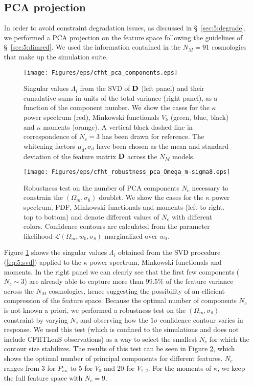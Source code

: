\subsection{PCA projection}
In order to avoid constraint degradation issues, as discussed in \S~\ref{sec:5:degrade}, we performed a PCA projection on the feature space following the guidelines of \S~\ref{sec:5:dimred}. We used the information contained in the $N_M=91$ cosmologies that make up the  simulation suite. 
%
\begin{figure}
\begin{center}
\texttt{[image: Figures/eps/cfht\_pca\_components.eps]}
\end{center}
\caption{Singular values $\Lambda_i$ from the SVD of $\mathbf{D}$ (left panel) and their cumulative sums in units of the total variance (right panel), as a function of the component number. We show the cases for the $\kappa$ power spectrum (red), Minkowski functionals $V_k$ (green, blue, black) and $\kappa$ moments (orange). A vertical black dashed line in correspondence of $N_c=3$ has been drawn for reference. The whitening factors $\mu_d,\sigma_d$ have been chosen as the mean and standard deviation of the feature matrix $\mathbf{D}$ across the $N_M$ models.}
\label{fig:6:pcacomp}
\end{figure} 
%
\begin{figure}
\begin{center}
\texttt{[image: Figures/eps/cfht\_robustness\_pca\_Omega\_m-sigma8.eps]}
\end{center}
\caption{Robustness test on the number of PCA components $N_c$ necessary to constrain the $(\Omega_m,\sigma_8)$ doublet. We show the cases for the $\kappa$ power spectrum, PDF, Minkowski functionals and moments (left to right, top to bottom) and denote different values of $N_c$ with different colors. Confidence contours are calculated from the parameter likelihood $\mathcal{L}(\Omega_m,w_0,\sigma_8)$ marginalized over $w_0$.}
\label{fig:6:robustness}
\end{figure}
%
Figure \ref{fig:6:pcacomp} shows the singular values $\Lambda_i$ obtained from the SVD procedure (\ref{eq:5:svd}) applied to the $\kappa$ power spectrum, Minkowski functionals and moments. In the right panel we can clearly see that the first few components ($N_c\sim 3$) are already able to capture more than 99.5\% of the feature variance across the $N_M$ cosmologies, hence suggesting the possibility of an efficient compression of the feature space. Because the optimal number of components $N_c$ is not known a priori, we performed a robustness test on the $(\Omega_m,\sigma_8)$ constraint by varying $N_c$ and observing how the $1\sigma$ confidence contour varies in response. We used this test (which is confined to the simulations and does not include CFHTLenS observations) as a way to select the smallest $N_c$ for which the contour size stabilizes. The results of this test can be seen in Figure \ref{fig:6:robustness}, which shows the optimal number of principal components for different features. $N_c$ ranges from 3 for $P_{\kappa\kappa}$ to 5 for $V_0$ and 20 for $V_{1,2}$. For the moments of $\kappa$, we keep the full feature space with $N_c=9$. 

